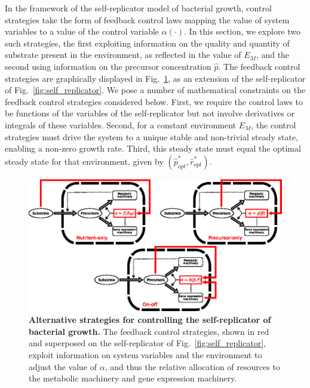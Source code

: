 In the framework of the self-replicator model of bacterial growth, control strategies take the form of feedback control laws mapping the value of system variables to a value of the control variable $\alpha(\cdot)$.
In this section, we explore two such strategies, the first exploiting information on the quality and quantity of substrate present in the environment, as reflected in the value of $E_M$, and the second using information on the precursor concentration $\hat{p}$.
The feedback control strategies are graphically displayed in Fig.~\ref{fig:strategies_overview}, as an extension of the self-replicator of Fig.~\ref{fig:self_replicator}.
We pose a number of mathematical constraints on the feedback control strategies considered below.
First, we require the control laws to be functions of the variables of the self-replicator but not involve derivatives or integrals of these variables.
Second, for a constant environment $E_M$, the control strategies must drive the system to a unique stable and non-trivial steady state, enabling a non-zero growth rate.
Third, this steady state must equal the optimal steady state for that environment, given by $(\hat{p}_{opt}^*,\hat{r}_{opt}^*)$.


\begin{figure}[tb]
\centering
\includegraphics[width=\textwidth]{./Fig/Fig5}
\caption{
\textbf{Alternative strategies for controlling the self-replicator of bacterial growth.}
The feedback control strategies, shown in red and superposed on the self-replicator of Fig.~\ref{fig:self_replicator}, exploit information on system variables and the environment to adjust the value of $\alpha$, and thus the relative allocation of resources to the metabolic machinery and gene expression machinery.
}
\label{fig:strategies_overview}
\end{figure}


